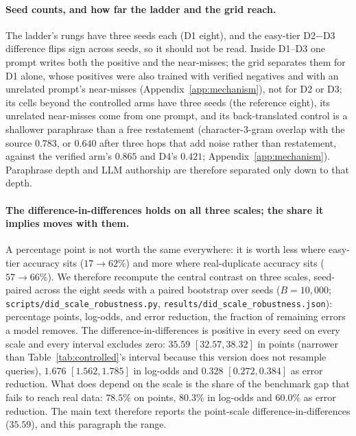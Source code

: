 \paragraph{Seed counts, and how far the ladder and the grid reach.}
The ladder's rungs have three seeds each (D1 eight), and the easy-tier D2$-$D3 difference flips sign across seeds, so it should not be read. Inside D1--D3 one prompt writes both the positive and the near-misses; the grid separates them for D1 alone, whose positives were also trained with verified negatives and with an unrelated prompt's near-misses (Appendix~\ref{app:mechanism}), not for D2 or D3; its cells beyond the controlled arms have three seeds (the reference eight), its unrelated near-misses come from one prompt, and its back-translated control is a shallower paraphrase than a free restatement (character-$3$-gram overlap with the source $0.783$, or $0.640$ after three hops that add noise rather than restatement, against the verified arm's $0.865$ and D4's $0.421$; Appendix~\ref{app:mechanism}). Paraphrase depth and LLM authorship are therefore separated only down to that depth.

\paragraph{The difference-in-differences holds on all three scales; the share it implies moves with them.}
A percentage point is not worth the same everywhere: it is worth less where easy-tier accuracy sits ($17 \to 62\%$) and more where real-duplicate accuracy sits ($57 \to 66\%$). We therefore recompute the central contrast on three scales, seed-paired across the eight seeds with a paired bootstrap over seeds ($B = 10{,}000$; \texttt{scripts/did\_scale\_robustness.py}, \texttt{results/did\_scale\_robustness.json}): percentage points, log-odds, and error reduction, the fraction of remaining errors a model removes. The difference-in-differences is positive in every seed on every scale and every interval excludes zero: $35.59$ $[32.57, 38.32]$ in points (narrower than Table~\ref{tab:controlled}'s interval because this version does not resample queries), $1.676$ $[1.562, 1.785]$ in log-odds and $0.328$ $[0.272, 0.384]$ as error reduction. What does depend on the scale is the share of the benchmark gap that fails to reach real data: $78.5\%$ on points, $80.3\%$ in log-odds and $60.0\%$ as error reduction. The main text therefore reports the point-scale difference-in-differences ($35.59$), and this paragraph the range.
